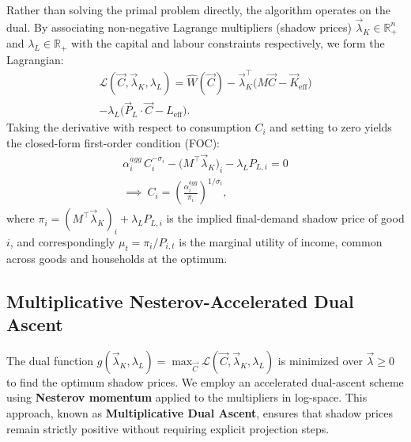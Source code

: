 Rather than solving the primal problem directly, the algorithm operates on the dual.
By associating non-negative Lagrange multipliers (shadow prices) $\vec{\lambda}_K \in \mathbb{R}^n_+$ and $\lambda_L \in \mathbb{R}_+$ with the capital and labour constraints respectively, we form the Lagrangian:
%
\begin{multline} \label{eq:lagrangian effective}
  \mathcal{L}(\vec{C}, \vec{\lambda}_K, \lambda_L) = \hat{W}(\vec{C})
     - \vec{\lambda}_K^\top \bigl(M\vec{C} - \vec{K}_{\mathrm{eff}}\bigr)\\
    - \lambda_L \bigl(\vec{P}_{L} \cdot \vec{C} - L_{\mathrm{eff}}\bigr).
\end{multline}
%
Taking the derivative with respect to consumption $C_i$ and setting to zero yields the closed-form first-order condition (FOC):
%
\begin{multline} \label{eq:foc}
     \alpha^{agg}_i\,C_i^{-\sigma_i} - \bigl(M^\top \vec{\lambda}_K\bigr)_i - \lambda_L P_{L, i} = 0 \\
     \implies \
     C_i = \left(\frac{\alpha^{agg}_i}{\pi_i}\right)^{1/\sigma_i},
\end{multline}
%
where $\pi_i = (M^\top \vec{\lambda}_K)_i + \lambda_L P_{L,i}$ is the
implied final-demand shadow price of good $i$, and correspondingly
$\mu_t = \pi_i / P_{i,t}$ is the marginal utility of income, common
across goods and households at the optimum.

\subsection{Multiplicative Nesterov-Accelerated Dual Ascent}

The dual function $g(\vec{\lambda}_K, \lambda_L) = \max_{\vec{C}} \mathcal{L}(\vec{C}, \vec{\lambda}_K, \lambda_L)$ is minimized over $\vec{\lambda} \geq 0$ to find the optimum shadow prices.
We employ an accelerated dual-ascent scheme using \textbf{Nesterov momentum} applied to the multipliers in log-space. This approach, known as \textbf{Multiplicative Dual Ascent}, ensures that shadow prices remain strictly positive without requiring explicit projection steps.

